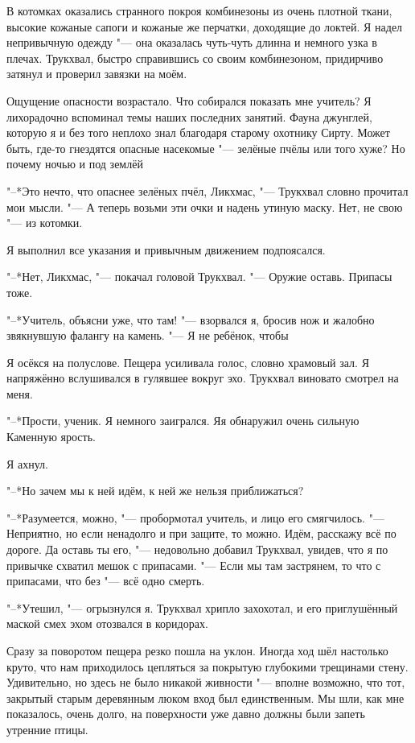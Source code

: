В котомках оказались странного покроя комбинезоны из очень плотной ткани, высокие кожаные сапоги и кожаные же перчатки, доходящие до локтей.
Я надел непривычную одежду "--- она оказалась чуть-чуть длинна и немного узка в плечах.
Трукхвал, быстро справившись со своим комбинезоном, придирчиво затянул и проверил завязки на моём.

Ощущение опасности возрастало.
Что собирался показать мне учитель?
Я лихорадочно вспоминал темы наших последних занятий.
Фауна джунглей, которую я и без того неплохо знал благодаря старому охотнику Сирту.
Может быть, где-то гнездятся опасные насекомые "--- зелёные пчёлы или того хуже?
Но почему ночью и под землёй\ldotsq

"--*Это нечто, что опаснее зелёных пчёл, Ликхмас, "--- Трукхвал словно прочитал мои мысли.
"--- А теперь возьми эти очки и надень утиную маску.
Нет, не свою "--- из котомки.

Я выполнил все указания и привычным движением подпоясался.

"--*Нет, Ликхмас, "--- покачал головой Трукхвал.
"--- Оружие оставь.
Припасы тоже.

"--*Учитель, объясни уже, что там! "--- взорвался я, бросив нож и жалобно звякнувшую фалангу на камень.
"--- Я не ребёнок, чтобы\ldotst

Я осёкся на полуслове.
Пещера усиливала голос, словно храмовый зал.
Я напряжённо вслушивался в гулявшее вокруг эхо.
Трукхвал виновато смотрел на меня.

"--*Прости, ученик.
Я немного заигрался.
Я\ldotst я обнаружил очень сильную Каменную ярость.

Я ахнул.

"--*Но зачем мы к ней идём, к ней же нельзя приближаться?

"--*Разумеется, можно, "--- пробормотал учитель, и лицо его смягчилось.
"--- Неприятно, но если ненадолго и при защите, то можно.
Идём, расскажу всё по дороге.
Да оставь ты его, "--- недовольно добавил Трукхвал, увидев, что я по привычке схватил мешок с припасами.
"--- Если мы там застрянем, то что с припасами, что без "--- всё одно смерть.

"--*Утешил, "--- огрызнулся я.
Трукхвал хрипло захохотал, и его приглушённый маской смех эхом отозвался в коридорах.

\razd

Сразу за поворотом пещера резко пошла на уклон.
Иногда ход шёл настолько круто, что нам приходилось цепляться за покрытую глубокими трещинами стену.
Удивительно, но здесь не было никакой живности "--- вполне возможно, что тот, закрытый старым деревянным люком вход был единственным.
Мы шли, как мне показалось, очень долго, на поверхности уже давно должны были запеть утренние птицы.

